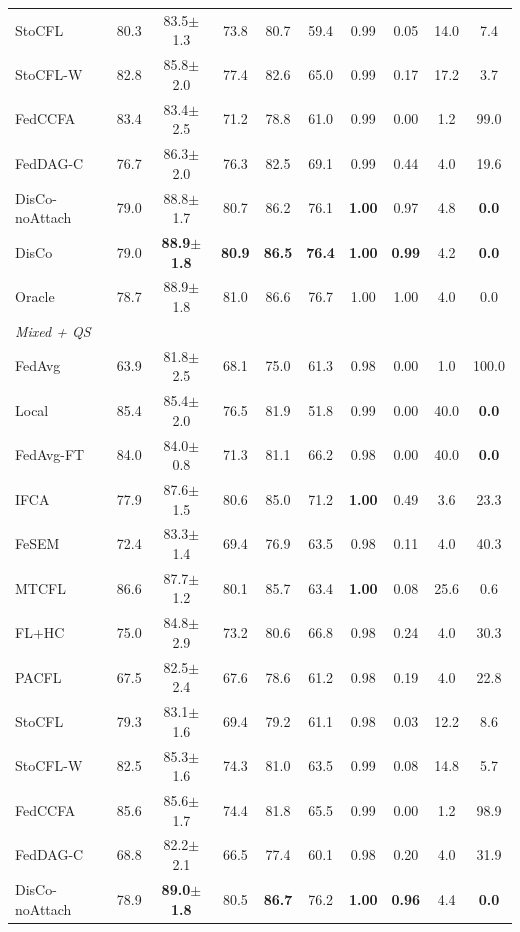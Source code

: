 \begin{tabular}{lccccccccc}
StoCFL & 80.3 & 83.5$\pm$1.3 & 73.8 & 80.7 & 59.4 & 0.99 & 0.05 & 14.0 & 7.4 \\
StoCFL-W & 82.8 & 85.8$\pm$2.0 & 77.4 & 82.6 & 65.0 & 0.99 & 0.17 & 17.2 & 3.7 \\
FedCCFA & 83.4 & 83.4$\pm$2.5 & 71.2 & 78.8 & 61.0 & 0.99 & 0.00 & 1.2 & 99.0 \\
FedDAG-C & 76.7 & 86.3$\pm$2.0 & 76.3 & 82.5 & 69.1 & 0.99 & 0.44 & 4.0 & 19.6 \\
DisCo-noAttach & 79.0 & 88.8$\pm$1.7 & 80.7 & 86.2 & 76.1 & \textbf{1.00} & 0.97 & 4.8 & \textbf{0.0} \\
DisCo & 79.0 & \textbf{88.9$\pm$1.8} & \textbf{80.9} & \textbf{86.5} & \textbf{76.4} & \textbf{1.00} & \textbf{0.99} & 4.2 & \textbf{0.0} \\
Oracle & 78.7 & 88.9$\pm$1.8 & 81.0 & 86.6 & 76.7 & 1.00 & 1.00 & 4.0 & 0.0 \\
\midrule
\multicolumn{10}{l}{\textit{Mixed + QS}}\\
FedAvg & 63.9 & 81.8$\pm$2.5 & 68.1 & 75.0 & 61.3 & 0.98 & 0.00 & 1.0 & 100.0 \\
Local & 85.4 & 85.4$\pm$2.0 & 76.5 & 81.9 & 51.8 & 0.99 & 0.00 & 40.0 & \textbf{0.0} \\
FedAvg-FT & 84.0 & 84.0$\pm$0.8 & 71.3 & 81.1 & 66.2 & 0.98 & 0.00 & 40.0 & \textbf{0.0} \\
IFCA & 77.9 & 87.6$\pm$1.5 & 80.6 & 85.0 & 71.2 & \textbf{1.00} & 0.49 & 3.6 & 23.3 \\
FeSEM & 72.4 & 83.3$\pm$1.4 & 69.4 & 76.9 & 63.5 & 0.98 & 0.11 & 4.0 & 40.3 \\
MTCFL & 86.6 & 87.7$\pm$1.2 & 80.1 & 85.7 & 63.4 & \textbf{1.00} & 0.08 & 25.6 & 0.6 \\
FL+HC & 75.0 & 84.8$\pm$2.9 & 73.2 & 80.6 & 66.8 & 0.98 & 0.24 & 4.0 & 30.3 \\
PACFL & 67.5 & 82.5$\pm$2.4 & 67.6 & 78.6 & 61.2 & 0.98 & 0.19 & 4.0 & 22.8 \\
StoCFL & 79.3 & 83.1$\pm$1.6 & 69.4 & 79.2 & 61.1 & 0.98 & 0.03 & 12.2 & 8.6 \\
StoCFL-W & 82.5 & 85.3$\pm$1.6 & 74.3 & 81.0 & 63.5 & 0.99 & 0.08 & 14.8 & 5.7 \\
FedCCFA & 85.6 & 85.6$\pm$1.7 & 74.4 & 81.8 & 65.5 & 0.99 & 0.00 & 1.2 & 98.9 \\
FedDAG-C & 68.8 & 82.2$\pm$2.1 & 66.5 & 77.4 & 60.1 & 0.98 & 0.20 & 4.0 & 31.9 \\
DisCo-noAttach & 78.9 & \textbf{89.0$\pm$1.8} & 80.5 & \textbf{86.7} & 76.2 & \textbf{1.00} & \textbf{0.96} & 4.4 & \textbf{0.0} \\

\end{tabular}

